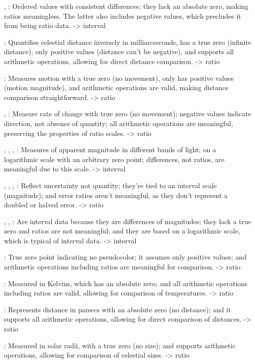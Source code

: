 , : Ordered values with consistent differences; they lack an absolute zero, making ratios meaningless. The latter also includes negative values, which precludes it from being ratio data. -> interval

: Quantifies celestial distance inversely in milliarcseconds, has a true zero (infinite distance), only positive values (distance can't be negative), and supports all arithmetic operations, allowing for direct distance comparison. -> ratio

: Measures motion with a true zero (no movement), only has positive values (motion magnitude), and arithmetic operations are valid, making distance comparison straightforward. -> ratio

, : Measure rate of change with true zero (no movement); negative values indicate direction, not absence of quantity; all arithmetic operations are meaningful, preserving the properties of ratio scales. -> ratio

, , , : Measures of apparent magnitude in different bands of light; on a logarithmic scale with an arbitrary zero point; differences, not ratios, are meaningful due to this scale. -> interval

, , , : Reflect uncertainty not quantity; they're tied to an interval scale (magnitude); and error ratios aren't meaningful, as they don't represent a doubled or halved error. -> ratio

, , : Are interval data because they are differences of magnitudes; they lack a true zero and ratios are not meaningful; and they are based on a logarithmic scale, which is typical of interval data. -> interval

: True zero point indicating no pseudocolor; it assumes only positive values; and arithmetic operations including ratios are meaningful for comparison. -> ratio

: Measured in Kelvins, which has an absolute zero; and all arithmetic operations including ratios are valid, allowing for comparison of temperatures. -> ratio

: Represents distance in parsecs with an absolute zero (no distance); and it supports all arithmetic operations, allowing for direct comparison of distances. -> ratio

: Measured in solar radii, with a true zero (no size); and supports arithmetic operations, allowing for comparison of celestial sizes. -> ratio

